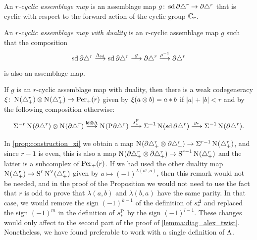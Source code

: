 \begin{definition}
	An \emph{$r$-cyclic assemblage map} is an assemblage map $g \colon \operatorname{sd} \partial \triangle^{r} \to \partial \triangle^{r}$ that is cyclic with respect to the forward action of the cyclic group $\mathbb{C}_{r}$.
\end{definition}

\begin{definition}
	An \emph{$r$-cyclic assemblage map with duality} is an $r$-cyclic assemblage map $g$ such that the composition
	\[\operatorname{sd} \partial \triangle^{r} \overset{\Lambda_{\operatorname{sd}}}{\longrightarrow} \operatorname{sd} \partial\triangle^{r} \overset{g}{\longrightarrow} \partial\triangle^{r}\overset{\rho^{-1}}{\longrightarrow} \partial\triangle^{r} \]
	is also an assemblage map.
\end{definition}

\begin{proposition}\label{prop:construction_xi}
	If $g$ is an $r$-cyclic assemblage map with duality, then there is a weak codegeneracy $\xi\colon \operatorname{N}_{}(\triangle_{+}^{r})\otimes \operatorname{N}_{}(\triangle_{+}^{r})\to \mathrm{Per}_+(r)$ given by $\xi(a\otimes b) = a*b$ if $|a|+|b|<r$ and by the following composition otherwise: 
	{\small
	\[
		\Sigma^{-r}\operatorname{N}_{}(\partial \triangle^{r})\otimes \operatorname{N}_{}(\partial \triangle^{r})
		\overset{\mathsf{id}\otimes \Lambda}{\longrightarrow}
		\operatorname{N}_{}({\operatorname{P}}\partial\triangle^{r})
		\overset{s_*^{{\operatorname{P}}}}{\longrightarrow}
		\Sigma^{-1}\operatorname{N}_{}(\operatorname{sd}\partial\triangle^{r})
		\overset{g_*}{\longrightarrow}
		\Sigma^{-1}\operatorname{N}_{}(\partial\triangle^{r}).
	\]
	}
\end{proposition}
\begin{remark}
	In \cref{prop:construction_xi} we obtain a map $\operatorname{N}_{}(\partial\triangle_{+}^{r}\otimes \partial\triangle_{+}^{r})\to \Sigma^{r-1}\operatorname{N}_{}(\triangle_{+}^{r})$, and since $r-1$ is even, this is also a map $\operatorname{N}_{}(\partial\triangle_{+}^{r}\otimes \partial\triangle_{+}^{r})\to \operatorname{S}^{r-1}\operatorname{N}_{}(\triangle_{+}^{r})$ and the latter is a subcomplex of $\mathrm{Per}_+(r)$. If we had used the other duality map $\operatorname{N}_{}(\triangle_{+}^{r})\to \operatorname{S}^{r}\operatorname{N}^\vee_{}(\triangle_{+}^{r})$ given by $a\mapsto (-1)^{\lambda(a^c,a)}$, then this remark would not be needed, and in the proof of the Proposition we would not need to use the fact that $r$ is odd to prove that $\lambda(a,b)$ and $\lambda(b,a)$ have the same parity. In that case, we would remove the sign $(-1)^{k-1}$ of the definition of $s_*^{\Delta}$ and replaced the sign $(-1)^m$ in the definition of $s_*^{\operatorname{P}}$ by the sign $(-1)^{l-1}$. These changes would only affect to the second part of the proof of \cref{lemma:diag_alex_twist}. Nonetheless, we have found preferable to work with a single definition of $\Lambda$.
\end{remark}
